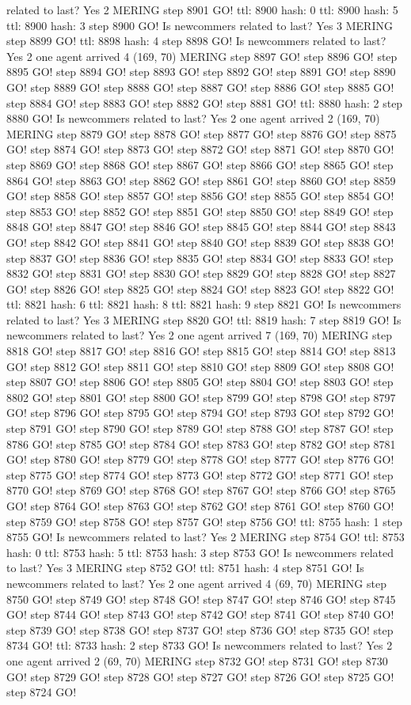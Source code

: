 related to last? Yes 2 MERING step 8901 GO! ttl: 8900 hash: 0 ttl: 8900 hash: 5 ttl: 8900 hash: 3 step 8900 GO! Is newcommers related to last? Yes 3 MERING step 8899 GO! ttl: 8898 hash: 4 step 8898 GO! Is newcommers related to last? Yes 2 one agent arrived 4 (169, 70) MERING step 8897 GO! step 8896 GO! step 8895 GO! step 8894 GO! step 8893 GO! step 8892 GO! step 8891 GO! step 8890 GO! step 8889 GO! step 8888 GO! step 8887 GO! step 8886 GO! step 8885 GO! step 8884 GO! step 8883 GO! step 8882 GO! step 8881 GO! ttl: 8880 hash: 2 step 8880 GO! Is newcommers related to last? Yes 2 one agent arrived 2 (169, 70) MERING step 8879 GO! step 8878 GO! step 8877 GO! step 8876 GO! step 8875 GO! step 8874 GO! step 8873 GO! step 8872 GO! step 8871 GO! step 8870 GO! step 8869 GO! step 8868 GO! step 8867 GO! step 8866 GO! step 8865 GO! step 8864 GO! step 8863 GO! step 8862 GO! step 8861 GO! step 8860 GO! step 8859 GO! step 8858 GO! step 8857 GO! step 8856 GO! step 8855 GO! step 8854 GO! step 8853 GO! step 8852 GO! step 8851 GO! step 8850 GO! step 8849 GO! step 8848 GO! step 8847 GO! step 8846 GO! step 8845 GO! step 8844 GO! step 8843 GO! step 8842 GO! step 8841 GO! step 8840 GO! step 8839 GO! step 8838 GO! step 8837 GO! step 8836 GO! step 8835 GO! step 8834 GO! step 8833 GO! step 8832 GO! step 8831 GO! step 8830 GO! step 8829 GO! step 8828 GO! step 8827 GO! step 8826 GO! step 8825 GO! step 8824 GO! step 8823 GO! step 8822 GO! ttl: 8821 hash: 6 ttl: 8821 hash: 8 ttl: 8821 hash: 9 step 8821 GO! Is newcommers related to last? Yes 3 MERING step 8820 GO! ttl: 8819 hash: 7 step 8819 GO! Is newcommers related to last? Yes 2 one agent arrived 7 (169, 70) MERING step 8818 GO! step 8817 GO! step 8816 GO! step 8815 GO! step 8814 GO! step 8813 GO! step 8812 GO! step 8811 GO! step 8810 GO! step 8809 GO! step 8808 GO! step 8807 GO! step 8806 GO! step 8805 GO! step 8804 GO! step 8803 GO! step 8802 GO! step 8801 GO! step 8800 GO! step 8799 GO! step 8798 GO! step 8797 GO! step 8796 GO! step 8795 GO! step 8794 GO! step 8793 GO! step 8792 GO! step 8791 GO! step 8790 GO! step 8789 GO! step 8788 GO! step 8787 GO! step 8786 GO! step 8785 GO! step 8784 GO! step 8783 GO! step 8782 GO! step 8781 GO! step 8780 GO! step 8779 GO! step 8778 GO! step 8777 GO! step 8776 GO! step 8775 GO! step 8774 GO! step 8773 GO! step 8772 GO! step 8771 GO! step 8770 GO! step 8769 GO! step 8768 GO! step 8767 GO! step 8766 GO! step 8765 GO! step 8764 GO! step 8763 GO! step 8762 GO! step 8761 GO! step 8760 GO! step 8759 GO! step 8758 GO! step 8757 GO! step 8756 GO! ttl: 8755 hash: 1 step 8755 GO! Is newcommers related to last? Yes 2 MERING step 8754 GO! ttl: 8753 hash: 0 ttl: 8753 hash: 5 ttl: 8753 hash: 3 step 8753 GO! Is newcommers related to last? Yes 3 MERING step 8752 GO! ttl: 8751 hash: 4 step 8751 GO! Is newcommers related to last? Yes 2 one agent arrived 4 (69, 70) MERING step 8750 GO! step 8749 GO! step 8748 GO! step 8747 GO! step 8746 GO! step 8745 GO! step 8744 GO! step 8743 GO! step 8742 GO! step 8741 GO! step 8740 GO! step 8739 GO! step 8738 GO! step 8737 GO! step 8736 GO! step 8735 GO! step 8734 GO! ttl: 8733 hash: 2 step 8733 GO! Is newcommers related to last? Yes 2 one agent arrived 2 (69, 70) MERING step 8732 GO! step 8731 GO! step 8730 GO! step 8729 GO! step 8728 GO! step 8727 GO! step 8726 GO! step 8725 GO! step 8724 GO! 